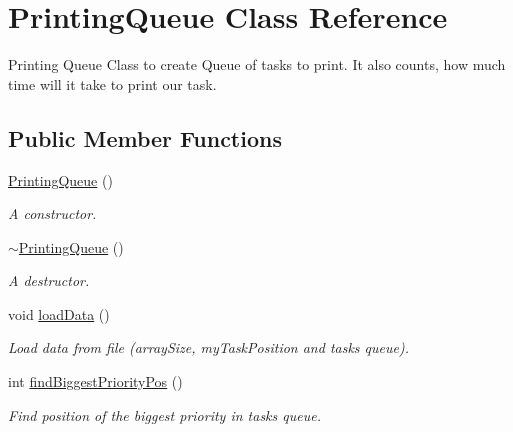 \hypertarget{class_printing_queue}{}\section{Printing\+Queue Class Reference}
\label{class_printing_queue}


Printing Queue Class to create Queue of tasks to print. It also counts, how much time will it take to print our task.  


\subsection*{Public Member Functions}
\begin{DoxyCompactItemize}
\item 
\mbox{\label{class_printing_queue_ac10560ecfc1388979e36190757b48201}} 
\hyperlink{class_printing_queue_ac10560ecfc1388979e36190757b48201}{Printing\+Queue} ()
\begin{DoxyCompactList}\small\item\em A constructor. \end{DoxyCompactList}\item 
\mbox{\label{class_printing_queue_a4077ce9841f87ac1eed6a005e66c0e52}} 
\hyperlink{class_printing_queue_a4077ce9841f87ac1eed6a005e66c0e52}{$\sim$\+Printing\+Queue} ()
\begin{DoxyCompactList}\small\item\em A destructor. \end{DoxyCompactList}\item 
\mbox{\label{class_printing_queue_a8aa91d067d02c2715b173c890e87d9a5}} 
void \hyperlink{class_printing_queue_a8aa91d067d02c2715b173c890e87d9a5}{load\+Data} ()
\begin{DoxyCompactList}\small\item\em Load data from file (array\+Size, my\+Task\+Position and tasks queue). \end{DoxyCompactList}\item 
int \hyperlink{class_printing_queue_a5da114a3b589a9511b1888a42c4cab92}{find\+Biggest\+Priority\+Pos} ()
\begin{DoxyCompactList}\small\item\em Find position of the biggest priority in tasks queue. \end{DoxyCompactList}\item 

\end{DoxyCompactItemize}
